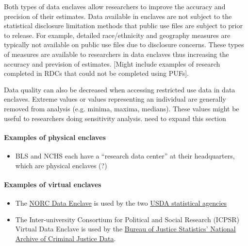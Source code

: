 Both types of data enclaves allow researchers to improve the accuracy and precision of their estimates. Data available in enclaves are not subject to the statistical disclosure limitation methods that public use files are subject to prior to release. For example, detailed race/ethnicity and geography measures are typically not available on public use files due to disclosure concerns. These types of measures are available to researchers in data enclaves thus increasing the accuracy and prevision of estimates.  [Might include examples of research completed in RDCs that could not be completed using PUFs].

Data quality can also be decreased when accessing restricted use data in data enclaves. Extreme values or values representing an individual are generally removed from analysis (e.g. minima, maxima, medians). These values might be useful to researchers doing sensitivity analysis. {need to expand this section}

\paragraph{Examples of physical enclaves}
\begin{itemize}
    \item BLS and NCHS each have a ``research data center'' at their headquarters, which are physical enclaves (?)
\end{itemize}

\paragraph{Examples of virtual enclaves}
\begin{itemize}
    \item The \href{https://www.norc.org/Research/Capabilities/Pages/data-enclave.aspx}{NORC Data Enclave} is used by the two \href{https://www.norc.org/Research/Projects/Pages/usda-ers-data-enclave.aspx}{USDA statistical agencies}
    \item The Inter-university Consortium for Political and Social Research (ICPSR) Virtual Data Enclave is used by the \href{https://www.icpsr.umich.edu/icpsrweb/content/NACJD/index.html}{Bureau of Justice Statistics' National Archive of Criminal Justice Data}. 
\end{itemize}

